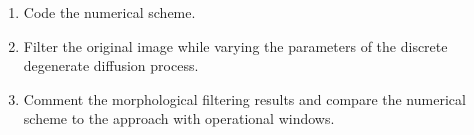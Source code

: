 \begin{qbox}
\begin{enumerate}
	\item Code the numerical scheme.
	\item Filter the original image while varying the parameters of the discrete degenerate diffusion process.
	\item Comment the morphological filtering results and compare the nu\-me\-ri\-cal sche\-me to the ap\-proach with operational windows.
\end{enumerate}
\end{qbox}

